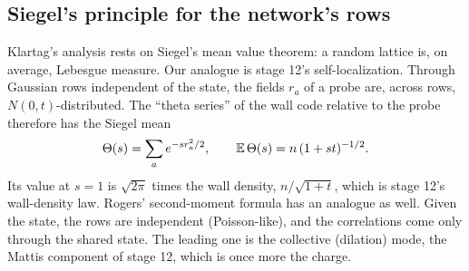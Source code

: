 \subsection{Siegel's principle for the network's rows}
Klartag's analysis rests on Siegel's mean value theorem: a random lattice is, on average, Lebesgue measure. Our analogue is stage
12's self-localization. Through Gaussian rows independent of the state, the fields $r_a$ of a probe are, across rows, $N(0,t)$-distributed.
The ``theta series'' of the wall code relative to the probe therefore has the Siegel mean
\[
\Theta(s)=\sum_a e^{-sr_a^2/2},\qquad \mathbb E\,\Theta(s)=n\,(1+st)^{-1/2}.
\]
Its value at $s=1$ is $\sqrt{2\pi}$ times the wall density, $n/\sqrt{1+t}$, which is stage 12's wall-density law. Rogers' second-moment
formula has an analogue as well. Given the state, the rows are independent (Poisson-like), and the correlations come only through the
shared state. The leading one is the collective (dilation) mode, the Mattis component of stage 12, which is once more the charge.
